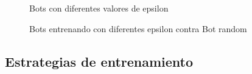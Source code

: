 \begin{figure}[H]
\begin{center}
\caption{Bots con diferentes valores de epsilon}
\label{fig:epsilon}
\end{center}
\end{figure}


\begin{figure}[H]
\begin{center}
\caption{Bots entrenando con diferentes epsilon contra Bot random}
\label{fig:epsilon2}
\end{center}
\end{figure}


\subsection{Estrategias de entrenamiento}
